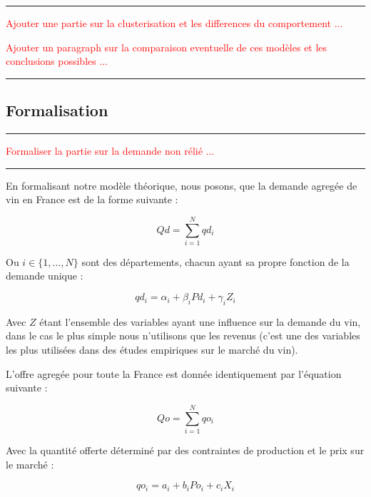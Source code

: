 \documentclass[11pt,]{article}
\begin{document}
\noindent

\rule[0.5ex]{\linewidth}{1pt}

\textcolor{red}{Ajouter une partie sur la clusterisation et les differences du comportement ...}

\textcolor{red}{Ajouter un paragraph sur la comparaison eventuelle de ces modèles et les conclusions possibles ...}

\noindent

\rule[0.5ex]{\linewidth}{1pt}

\hypertarget{formalisation}{%
\subsection{Formalisation}\label{formalisation}}

\noindent

\rule[0.5ex]{\linewidth}{1pt}

\textcolor{red}{Formaliser la partie sur la demande non rélié ...}

\noindent

\rule[0.5ex]{\linewidth}{1pt}

En formalisant notre modèle théorique, nous posons, que la demande
agregée de vin en France est de la forme suivante :

\begin{equation}
    Qd = \sum_{i = 1}^{N} qd_i 
\end{equation}

Ou \(i \in \{1, ..., N\}\) sont des départements, chacun ayant sa propre
fonction de la demande unique :

\begin{equation}
    qd_i = \alpha_i + \beta_i Pd_i + \gamma_i Z_i 
\end{equation}

Avec \(Z\) étant l'ensemble des variables ayant une influence sur la
demande du vin, dans le cas le plus simple nous n'utilisons que les
revenus (c'est une des variables les plus utilisées dans des études
empiriques sur le marché du vin).

L'offre agregée pour toute la France est donnée identiquement par
l'équation suivante :

\begin{equation}
    Qo = \sum_{i = 1}^{N} qo_i
\end{equation}

Avec la quantité offerte déterminé par des contraintes de production et
le prix sur le marché :

\begin{equation}
    qo_i = a_i + b_i Po_i + c_i X_i
\end{equation}
\end{document}

